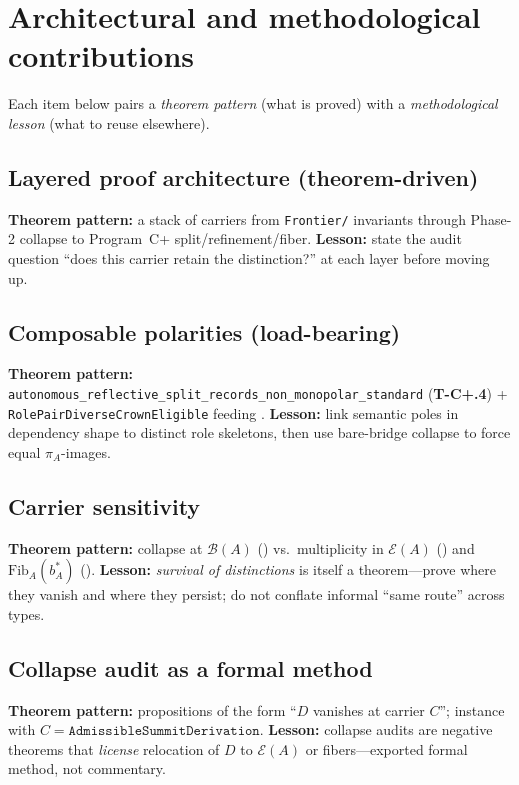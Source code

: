 \documentclass[11pt]{article}
\begin{document}
\section{Architectural and methodological contributions}\label{sec:contributions}

Each item below pairs a \emph{theorem pattern} (what is proved) with a \emph{methodological lesson} (what to reuse elsewhere).

\subsection{Layered proof architecture (theorem-driven)}\label{sec:contributions-proof}
\textbf{Theorem pattern:} a stack of carriers from \texttt{Frontier/} invariants through Phase-2 collapse  to Program~C+ split/refinement/fiber. \textbf{Lesson:} state the audit question ``does this carrier retain the distinction?'' at each layer before moving up.

\subsection{Composable polarities (load-bearing)}\label{sec:contributions-polarities}
\textbf{Theorem pattern:} \texttt{autonomous\_reflective\_split\_records\_non\_monopolar\_standard} (\textbf{T-C+.4}) + \texttt{RolePairDiverseCrownEligible} feeding . \textbf{Lesson:} link semantic poles in dependency shape to distinct role skeletons, then use bare-bridge collapse to force equal $\pi_A$-images.

\subsection{Carrier sensitivity}\label{sec:contributions-carrier}
\textbf{Theorem pattern:} collapse at $\mathcal{B}(A)$ () vs.\ multiplicity in $\mathcal{E}(A)$ () and $\mathrm{Fib}_A(b^\ast_A)$ (). \textbf{Lesson:} \emph{survival of distinctions} is itself a theorem---prove where they vanish and where they persist; do not conflate informal ``same route'' across types.

\subsection{Collapse audit as a formal method}\label{sec:contributions-audit}
\textbf{Theorem pattern:} propositions of the form ``$D$ vanishes at carrier $C$''; instance  with $C = \texttt{AdmissibleSummitDerivation}$. \textbf{Lesson:} collapse audits are negative theorems that \emph{license} relocation of $D$ to $\mathcal{E}(A)$ or fibers---exported formal method, not commentary.
\end{document}

